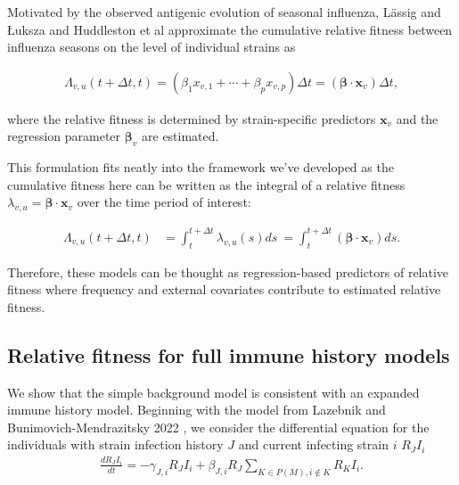 \documentclass[11pt,oneside,letterpaper]{article}
\renewcommand{\vec}[1]{\boldsymbol{#1}}
\begin{document}
Motivated by the observed antigenic evolution of seasonal influenza, L{\"a}ssig and {\L}uksza \cite{luksza2014predictive} and Huddleston et al \cite{Huddleston2020} approximate the cumulative relative fitness between influenza seasons on the level of individual strains as

\begin{align*}
    \Lambda_{v,u}(t + \Delta t,t) = (\beta_{1} x_{v,1} + \cdots + \beta_{p} x_{v, p})\Delta t = (\vec{\beta} \cdot \vec{x}_{v}) \Delta t,
\end{align*}

where the relative fitness is determined by strain-specific predictors $\vec{x}_{v}$ and the regression parameter $\vec{\beta}_{v}$ are estimated.

This formulation fits neatly into the framework we've developed as the cumulative fitness here can be written as the integral of a relative fitness $\lambda_{v, u} =  \vec{\beta} \cdot \vec{x}_{v}$ over the time period of interest:

\begin{align*}
    \Lambda_{v,u}(t + \Delta t,t)  &= \int_{t}^{t+\Delta t} \lambda_{v,u}(s)ds\ = \int_{t}^{t + \Delta t} (\vec{\beta} \cdot \vec{x}_{v}) ds.
\end{align*}

Therefore, these models can be thought as regression-based predictors of relative fitness where frequency and external covariates contribute to estimated relative fitness.

\subsection{Relative fitness for full immune history models}\label{ssec:full_immune_history}

We show that the simple background model is consistent with an expanded immune history model.
Beginning with the model from Lazebnik and Bunimovich-Mendrazitsky 2022 \cite{Lazebnik2022}, we consider the differential equation for the individuals with strain infection history $J$ and current infecting strain $i$ $R_{J}I_{i}$
\begin{align*}
\frac{dR_{J} I_{i}}{dt} = - \gamma_{J, i} R_{J} I_{i} + \beta_{J, i} R_{J} \sum_{K \in P(M), i\notin K} R_{K}I_{i}.
\end{align*}
\end{document}
